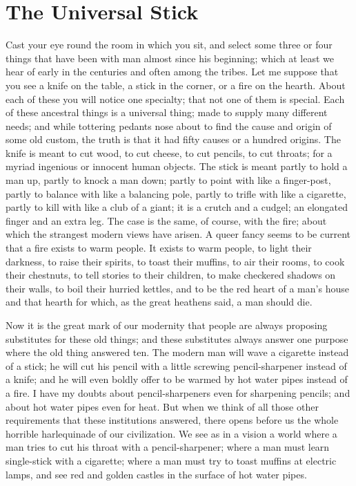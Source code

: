 \documentclass{book}
\begin{document}
\chapter{The Universal Stick}
\label{chapter-20}
Cast your eye round the room in which you sit, and select some three or four things that have been with man almost since his beginning; which at least we hear of early in the centuries and often among the tribes. Let me suppose that you see a knife on the table, a stick in the corner, or a fire on the hearth. About each of these you will notice one specialty; that not one of them is special. Each of these ancestral things is a universal thing; made to supply many different needs; and while tottering pedants nose about to find the cause and origin of some old custom, the truth is that it had fifty causes or a hundred origins. The knife is meant to cut wood, to cut cheese, to cut pencils, to cut throats; for a myriad ingenious or innocent human objects. The stick is meant partly to hold a man up, partly to knock a man down; partly to point with like a finger-post, partly to balance with like a balancing pole, partly to trifle with like a cigarette, partly to kill with like a club of a giant; it is a crutch and a cudgel; an elongated finger and an extra leg. The case is the same, of course, with the fire; about which the strangest modern views have arisen. A queer fancy seems to be current that a fire exists to warm people. It exists to warm people, to light their darkness, to raise their spirits, to toast their muffins, to air their rooms, to cook their chestnuts, to tell stories to their children, to make checkered shadows on their walls, to boil their hurried kettles, and to be the red heart of a man’s house and that hearth for which, as the great heathens said, a man should die.

Now it is the great mark of our modernity that people are always proposing substitutes for these old things; and these substitutes always answer one purpose where the old thing answered ten. The modern man will wave a cigarette instead of a stick; he will cut his pencil with a little screwing pencil-sharpener instead of a knife; and he will even boldly offer to be warmed by hot water pipes instead of a fire. I have my doubts about pencil-sharpeners even for sharpening pencils; and about hot water pipes even for heat. But when we think of all those other requirements that these institutions answered, there opens before us the whole horrible harlequinade of our civilization. We see as in a vision a world where a man tries to cut his throat with a pencil-sharpener; where a man must learn single-stick with a cigarette; where a man must try to toast muffins at electric lamps, and see red and golden castles in the surface of hot water pipes.
\end{document}
